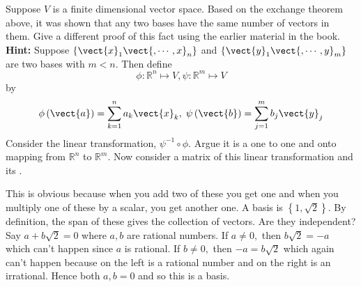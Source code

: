 \begin{enumialphparenastyle}
\begin{ex} Suppose $V$ is a finite dimensional vector space. Based on the
exchange theorem above, it was shown that any two bases have the same number
of vectors in them. Give a different proof of this fact using the earlier
material in the book. \textbf{Hint: }Suppose $\left\{ \vect{x}_{1}\vect{
,\cdots ,x}_{n}\right\} $ and $\left\{ \vect{y}_{1}\vect{,\cdots ,y}
_{m}\right\} $ are two bases with $m<n.$ Then define 
\begin{equation*}
\phi :\mathbb{R}^{n}\mapsto V,\psi :\mathbb{R}^{m}\mapsto V
\end{equation*}
by 
\begin{equation*}
\phi \left( \vect{a}\right) = \sum_{k=1}^{n}a_{k}\vect{x}
_{k},\;\psi \left( \vect{b}\right) = \sum_{j=1}^{m}b_{j}\vect{y}_{j}
\end{equation*}
Consider the linear transformation, $\psi ^{-1}\circ \phi .$ Argue it is a
one to one and onto mapping from $\mathbb{R}^{n}$ to $\mathbb{R}^{m}.$ Now
consider a matrix of this linear transformation and its \rref.
\begin{sol}
This is obvious because
when you add two of these you get one and when you multiply one of these by
a scalar, you get another one. A basis is $\left\{ 1,\sqrt{2}\right\} $. By
definition, the span of these gives the collection of vectors. Are they
independent? Say $a+b\sqrt{2}=0$ where $a,b$ are rational numbers. If $a\neq
0,$ then $b\sqrt{2}=-a$ which can't happen since $a$ is rational. If $b\neq
0,$ then $-a=b\sqrt{2}$ which again can't happen because on the left is a
rational number and on the right is an irrational. Hence both $a,b=0$ and so
this is a basis.
\end{sol}
\end{ex}

\end{enumialphparenastyle}